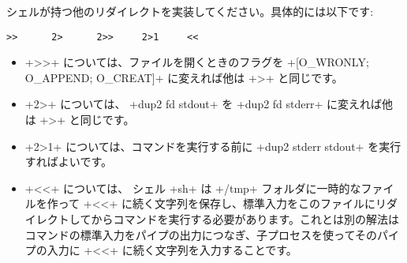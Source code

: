 \begin{exercise}
シェルが持つ他のリダイレクトを実装してください。具体的には以下です:
%
\begin{lstlisting}
>>      2>      2>>     2>1     <<
\end{lstlisting}
%
\end{exercise}
\begin{answer}
\begin{itemize}
\item \ml+>>+ については、ファイルを開くときのフラグを \ml+[O_WRONLY; O_APPEND; O_CREAT]+ に変えれば他は \ml+>+ と同じです。
%
\item \ml+2>+ については、 \ml+dup2 fd stdout+ を \ml+dup2 fd stderr+ に変えれば他は \ml+>+ と同じです。
%
\item \ml+2>1+ については、コマンドを実行する前に \ml+dup2 stderr stdout+ を実行すればよいです。
%
\item \ml+<<+ については、 シェル \ml+sh+ は \ml+/tmp+ フォルダに一時的なファイルを作って \ml+<<+ に続く文字列を保存し、標準入力をこのファイルにリダイレクトしてからコマンドを実行する必要があります。これとは別の解法はコマンドの標準入力をパイプの出力につなぎ、子プロセスを使ってそのパイプの入力に \ml+<<+ に続く文字列を入力することです。

\end{itemize}
\end{answer}

